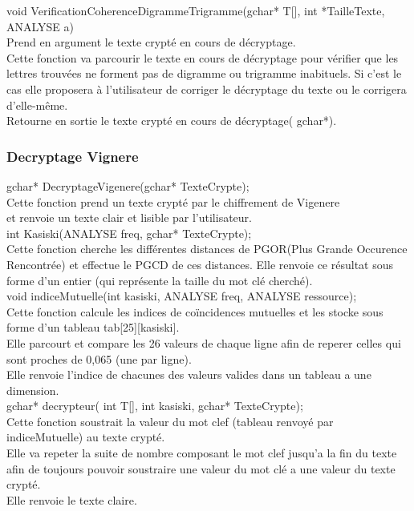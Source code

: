 \documentclass[a4]{article}
\begin{document}
	void VerificationCoherenceDigrammeTrigramme(gchar* T[], int *TailleTexte, ANALYSE a)\\
		Prend en argument le texte crypté en cours de décryptage.\\
		Cette fonction va parcourir le texte en cours de décryptage pour vérifier que les lettres trouvées 
		ne forment pas de digramme ou trigramme inabituels. Si c'est le cas elle proposera à l'utilisateur 
		de corriger le décryptage du texte ou le corrigera d'elle-même.\\
		Retourne en sortie le texte crypté en cours de décryptage( gchar*).\\
	
	
	\subsubsection{Decryptage Vignere}
	gchar* DecryptageVigenere(gchar* TexteCrypte);\\
		Cette fonction prend un texte crypté par le chiffrement de Vigenere \\
		et renvoie un texte clair et lisible par l'utilisateur.\\
	
	int Kasiski(ANALYSE freq, gchar* TexteCrypte);\\
		Cette fonction cherche les différentes distances de PGOR(Plus Grande Occurence Rencontrée) et effectue
		le PGCD de ces distances. Elle renvoie ce résultat sous forme d'un entier (qui représente la taille du mot clé cherché).\\
	
	void indiceMutuelle(int kasiski, ANALYSE freq, ANALYSE ressource);\\
		Cette fonction calcule les indices de coïncidences mutuelles et les stocke sous forme d'un tableau tab[25][kasiski].\\
		Elle parcourt et compare les 26 valeurs de chaque ligne afin de reperer celles qui sont proches de 0,065 (une par ligne).\\
		Elle renvoie l'indice de chacunes des valeurs valides dans un tableau a une dimension. \\
	
	gchar* decrypteur( int T[], int kasiski, gchar* TexteCrypte);\\
		Cette fonction soustrait la valeur du mot clef (tableau renvoyé par indiceMutuelle) au texte crypté.\\
		Elle va repeter la suite de nombre composant le mot clef jusqu'a la fin du texte afin de toujours pouvoir
		soustraire une valeur du mot clé a une valeur du texte crypté.\\
		Elle renvoie le texte claire.\\
		
\end{document}
